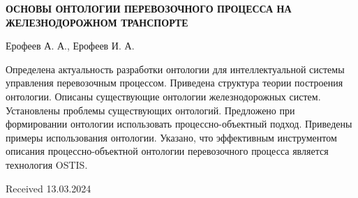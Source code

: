 \documentclass[a4paper]{article}
\begin{document}
\begin{multicols}{2}
\begin{center}
\par\textbf{ОСНОВЫ ОНТОЛОГИИ ПЕРЕВОЗОЧНОГО ПРОЦЕССА НА ЖЕЛЕЗНОДОРОЖНОМ ТРАНСПОРТЕ}
\end{center}

\begin{center}
{Ерофеев А. А., Ерофеев И. А.}
\end{center}

\par Определена актуальность разработки онтологии для интеллектуальной системы управления перевозочным
процессом. Приведена структура теории построения онтологии. Описаны существующие онтологии железнодорожных систем. Установлены проблемы существующих онтологий. Предложено при формировании онтологии использовать процессно-объектный подход. Приведены примеры использования онтологии. Указано, что эффективным инструментом описания процессно-объектной онтологии перевозочного процесса является технология OSTIS.

\begin{flushright}
\par Received 13.03.2024
\end{flushright}

\end{multicols}
\end{document}
